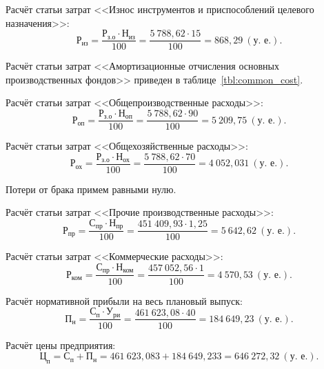 Расчёт статьи затрат
<<Износ инструментов и приспособлений целевого назначения>>:
\begin{equation*}
\text{Р}_{\text{из}} =
\dfrac{
  \text{Р}_{\text{з.о}} \cdot \text{Н}_{\text{из}}
}{
  100
} =
\dfrac{5~788{,}62 \cdot 15}{100} =
868{,}29~(\text{у.~е.}).
\end{equation*}

Расчёт статьи затрат
<<Амортизационные отчисления основных производственных фондов>>
приведен в таблице~\ref{tbl:common_cost}.


Расчёт статьи затрат
<<Общепроизводственные расходы>>:
\begin{equation*}
\text{Р}_{\text{оп}} =
\dfrac{
  \text{Р}_{\text{з.о}} \cdot \text{Н}_{\text{оп}}
}{
  100
} =
\dfrac{5~788{,}62 \cdot 90}{100} =
5~209{,}75 ~ (\text{у.~е.}).
\end{equation*}


Расчёт статьи затрат
<<Общехозяйственные расходы>>:
\begin{equation*}
\text{Р}_{\text{ох}} =
\dfrac{
  \text{Р}_{\text{з.о}} \cdot \text{Н}_{\text{ох}}
}{
  100
} =
\dfrac{5~788{,}62 \cdot 70}{100} =
4~052{,}031 \: (\text{у.~е.}).
\end{equation*}

Потери от брака примем равными нулю.

Расчёт статьи затрат
<<Прочие производственные расходы>>:
\begin{equation*}
\text{Р}_{\text{пр}} =
\dfrac{
  \text{С}_{\text{пр}} \cdot \text{Н}_{\text{пр}}
}{
  100
} =
\dfrac{451~409{,}93 \cdot 1{,}25}{100} = 5~642{,}62 ~ (\text{у.~е.}).
\end{equation*}

Расчёт статьи затрат
<<Коммерческие расходы>>:
\begin{equation*}
\text{Р}_{\text{ком}} =
\dfrac{
  \text{С}_{\text{пр}} \cdot \text{Н}_{\text{ком}}
}{
  100
} =
\dfrac{457~052{,}56 \cdot 1}{100} = 4~570{,}53 \: (\text{у.~е.}).
\end{equation*}

Расчёт нормативной прибыли на весь плановый выпуск:
\begin{equation*}
\text{П}_{\text{н}} =
\dfrac{
  \text{С}_{\text{п}} \cdot \text{У}_{\text{ри}}
}{
  100
} =
\dfrac{461~623{,}08 \cdot 40}{100} = 184~649{,}23 ~ (\text{у.~е.}).
\end{equation*}

Расчёт цены предприятия:
\begin{equation*}
\text{Ц}_{\text{п}} =
\text{С}_{\text{п}} + \text{П}_{\text{н}} =
461~623{,}083 + 184~649{,}233 = 646~272{,}32 ~ (\text{у.~е.}).
\end{equation*}

